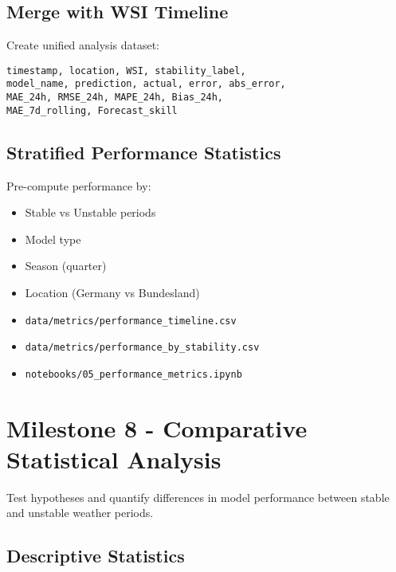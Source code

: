\documentclass[11pt,a4paper]{article}
\begin{document}
\subsection{Merge with WSI Timeline}

Create unified analysis dataset:
\begin{verbatim}
timestamp, location, WSI, stability_label,
model_name, prediction, actual, error, abs_error,
MAE_24h, RMSE_24h, MAPE_24h, Bias_24h,
MAE_7d_rolling, Forecast_skill
\end{verbatim}

\subsection{Stratified Performance Statistics}

Pre-compute performance by:
\begin{itemize}
    \item Stable vs Unstable periods
    \item Model type
    \item Season (quarter)
    \item Location (Germany vs Bundesland)
\end{itemize}

\begin{deliverablebox}
\begin{itemize}
    \item \texttt{data/metrics/performance\_timeline.csv}
    \item \texttt{data/metrics/performance\_by\_stability.csv}
    \item \texttt{notebooks/05\_performance\_metrics.ipynb}
\end{itemize}
\end{deliverablebox}

\section{Milestone 8 - Comparative Statistical Analysis}

\begin{objectivebox}
Test hypotheses and quantify differences in model performance between stable and unstable weather periods.
\end{objectivebox}

\subsection{Descriptive Statistics}
\end{document}
